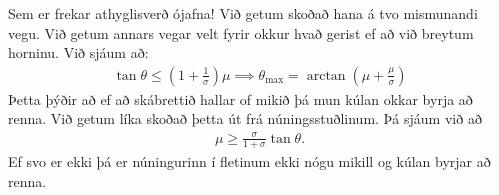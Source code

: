 Sem er frekar athyglisverð ójafna! Við getum skoðað hana á tvo mismunandi vegu. Við getum annars vegar velt fyrir okkur hvað gerist ef að við breytum horninu. Við sjáum að:
\begin{align*}
    \tan\theta \leq \left(1+\frac{1}{\sigma}\right)\mu \implies \theta_{\text{max}} = \arctan\left(\mu+\frac{\mu}{\sigma}\right)
\end{align*}
Þetta þýðir að ef að skábrettið hallar of mikið þá mun kúlan okkar byrja að renna. Við getum líka skoðað þetta út frá núningsstuðlinum. Þá sjáum við að
\begin{align*}
    \mu \geq \frac{\sigma}{1+\sigma}\tan\theta.
\end{align*}
Ef svo er ekki þá er núningurinn í fletinum ekki nógu mikill og kúlan byrjar að renna.

